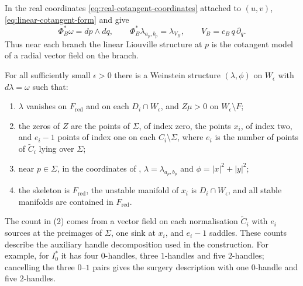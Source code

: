 \documentclass[a4paper]{amsart}
\numberwithin{equation}{section}
\begin{document}
In the real coordinates \eqref{eq:real-cotangent-coordinates} attached to
$(u,v)$, \eqref{eq:linear-cotangent-form} and 
give
\begin{equation}\label{eq:branch-cotangent-model}
 \Phi_B^*\omega=dp\wedge dq,\qquad
 \Phi_B^*\lambda_{a_p,b_p}=\lambda_{V_B},\qquad
 V_B=c_B\,q\,\partial_q .
\end{equation}
Thus near each branch the linear Liouville structure at $p$ is the
cotangent model of a radial vector field on the branch.

\begin{proposition}\label{prop:neighbourhood-weinstein}
For all sufficiently small $\epsilon>0$ there is a Weinstein structure
$(\lambda,\phi)$ on $W_\epsilon$ with $d\lambda=\omega$ such that:
\begin{enumerate}
\item $\lambda$ vanishes on $F_{\mathrm{red}}$ and on
each $D_i\cap W_\epsilon$, and $Z\mu>0$ on $W_\epsilon\setminus F$;
\item the zeros of $Z$ are the points of $\Sigma$, of index zero, the
points $x_i$, of index two, and $e_i-1$ points of index one on each
$C_i\setminus\Sigma$, where $e_i$ is the number of points of
$\widetilde C_i$ lying over $\Sigma$;
\item near $p\in\Sigma$, in the coordinates of
, $\lambda=\lambda_{a_p,b_p}$ and
$\phi=|x|^2+|y|^2$;
\item the skeleton is $F_{\mathrm{red}}$, the unstable manifold of $x_i$
is $D_i\cap W_\epsilon$, and all stable manifolds are contained in
$F_{\mathrm{red}}$.
\end{enumerate}
\end{proposition}

The count in (2) comes from a vector field on each normalisation
$\widetilde C_i$ with $e_i$ sources at the preimages of $\Sigma$, one
sink at $x_i$, and $e_i-1$ saddles. These counts describe the auxiliary
handle decomposition used in the construction. For example, for $I_0^*$
it has four $0$-handles, three $1$-handles and five $2$-handles;
cancelling the three $0$--$1$ pairs gives the surgery description with
one $0$-handle and five $2$-handles.
\end{document}
